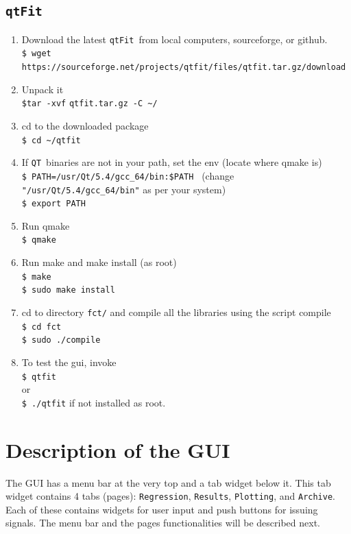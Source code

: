 \documentclass[10pt,letterpaper,oneside]{article}
\newcommand{\qt}{\texttt{QT}}
\newcommand{\name}{\texttt{qtFit}}
\newcommand{\package}{\texttt{qtfit.tar.gz}}
\newcommand{\sourceforge}{\texttt{https://sourceforge.net/projects/qtfit/files/qtfit.tar.gz/download}}
\begin{document}
\subsection{\name}
\begin{enumerate}
 \item Download the latest \name\ from local computers, sourceforge, or github.\\
\verb+$ wget+ \sourceforge
 \item  Unpack it  \\     \verb+$tar -xvf+ \package\ \verb+-C ~/+
 \item  cd to the downloaded package
  \\  \verb+$ cd ~/qtfit+

 \item  If \qt\ binaries are not in your path, set the env (locate where qmake is)
\\    \verb+$ PATH=/usr/Qt/5.4/gcc_64/bin:$PATH + (change \verb+"/usr/Qt/5.4/gcc_64/bin"+ as per your system)
 \\   \verb+$ export PATH+

 \item  Run qmake
\\   \verb+$ qmake+

 \item  Run make and make install (as root)
 \\ \verb+$ make+
 \\ \verb+$ sudo make install+

 \item cd to directory \verb+fct/+ and compile all the libraries using the script compile
\\ \verb+$ cd fct+
\\   \verb+$ sudo ./compile+

 \item  To test the gui, invoke
\\  \verb+$ qtfit+
\\   or
\\  \verb+$ ./qtfit+ if not installed as root.
\end{enumerate}



\newpage
\section{Description of the GUI} 
The GUI has a menu bar at the very top and a tab widget below it. 
This tab widget contains 4 tabs (pages): \verb+Regression+, \verb+Results+, \verb+Plotting+, and \verb+Archive+. 
Each of these contains widgets for user  input and push buttons for issuing signals. 
The menu bar and the pages functionalities will be described next.
\end{document}
